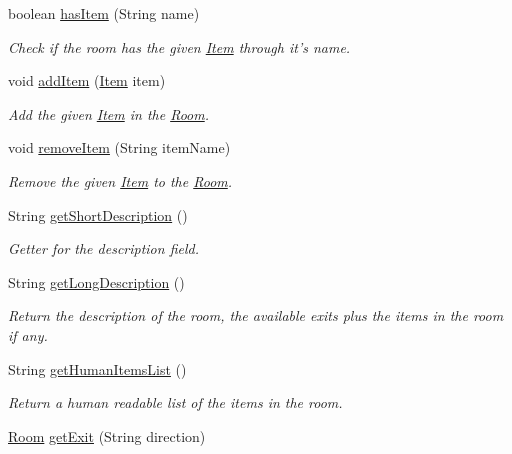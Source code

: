 \begin{DoxyCompactItemize}
boolean \hyperlink{classpkg__world_1_1Room_aefa26e1bc5088dd199dde2e9d471c490}{has\-Item} (String name)
\begin{DoxyCompactList}\small\item\em Check if the room has the given \hyperlink{classpkg__world_1_1Item}{Item} through it's name. \end{DoxyCompactList}\item 
void \hyperlink{classpkg__world_1_1Room_a118585101b274edfdd43b724382de89c}{add\-Item} (\hyperlink{classpkg__world_1_1Item}{Item} item)
\begin{DoxyCompactList}\small\item\em Add the given \hyperlink{classpkg__world_1_1Item}{Item} in the \hyperlink{classpkg__world_1_1Room}{Room}. \end{DoxyCompactList}\item 
void \hyperlink{classpkg__world_1_1Room_ab84c99b33e69d4a3e0700cab4b9efeaa}{remove\-Item} (String item\-Name)
\begin{DoxyCompactList}\small\item\em Remove the given \hyperlink{classpkg__world_1_1Item}{Item} to the \hyperlink{classpkg__world_1_1Room}{Room}. \end{DoxyCompactList}\item 
String \hyperlink{classpkg__world_1_1Room_adb98ed16e34549faabed35f90673d266}{get\-Short\-Description} ()
\begin{DoxyCompactList}\small\item\em Getter for the description field. \end{DoxyCompactList}\item 
String \hyperlink{classpkg__world_1_1Room_acc8ee9123c9a77428c1e66fbba34aeac}{get\-Long\-Description} ()
\begin{DoxyCompactList}\small\item\em Return the description of the room, the available exits plus the items in the room if any. \end{DoxyCompactList}\item 
String \hyperlink{classpkg__world_1_1Room_a3ea436ad00d00484b429992ef94535ac}{get\-Human\-Items\-List} ()
\begin{DoxyCompactList}\small\item\em Return a human readable list of the items in the room. \end{DoxyCompactList}\item 
\hyperlink{classpkg__world_1_1Room}{Room} \hyperlink{classpkg__world_1_1Room_ae05ae991a1692ffb29e8aef632d18b95}{get\-Exit} (String direction)

\end{DoxyCompactItemize}
